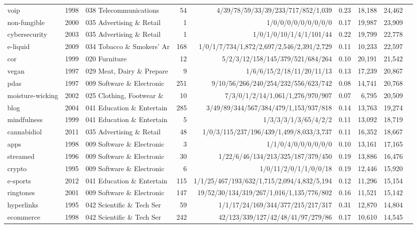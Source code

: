 {\begin{tabular}{llp{3.2cm}rrp{3.4cm}rrr}
voip & 1998 & 038 Telecommunications & 54 & 4/39/78/59/33/39/233/717/852/1,039 & 0.23 & 18,188 & 24,462 \\
non-fungible & 2000 & 035 Advertising \& Retail & 1 & 1/0/0/0/0/0/0/0/0/0 & 0.17 & 19,987 & 23,909 \\
cybersecurity & 2003 & 035 Advertising \& Retail & 1 & 1/0/1/0/10/1/4/1/101/44 & 0.22 & 19,799 & 22,778 \\
e-liquid & 2009 & 034 Tobacco \& Smokers' Ar & 168 & 1/0/1/7/734/1,872/2,697/2,546/2,391/2,729 & 0.11 & 10,233 & 22,597 \\
cor & 1999 & 020 Furniture & 12 & 5/2/3/12/158/145/379/521/684/264 & 0.10 & 20,191 & 21,542 \\
vegan & 1997 & 029 Meat, Dairy \& Prepare & 9 & 1/6/6/15/2/18/11/20/11/13 & 0.13 & 17,239 & 20,867 \\
pdas & 1997 & 009 Software \& Electronic & 251 & 9/10/56/266/240/254/232/556/623/742 & 0.08 & 14,741 & 20,768 \\
moisture-wicking & 2002 & 025 Clothing, Footwear \&  & 10 & 7/3/0/1/2/14/1,061/1,276/970/907 & 0.07 & 6,795 & 20,509 \\
blog & 2004 & 041 Education \& Entertain & 285 & 3/49/89/344/567/384/479/1,153/937/818 & 0.14 & 13,763 & 19,274 \\
mindfulness & 1999 & 041 Education \& Entertain & 5 & 1/3/3/3/1/3/65/4/2/2 & 0.11 & 13,092 & 18,719 \\
cannabidiol & 2011 & 035 Advertising \& Retail & 48 & 1/0/3/115/237/196/439/1,499/8,033/3,737 & 0.11 & 16,352 & 18,667 \\
apps & 1998 & 009 Software \& Electronic & 3 & 1/1/0/4/0/0/0/0/0/0 & 0.10 & 13,161 & 17,165 \\
streamed & 1996 & 009 Software \& Electronic & 30 & 1/22/6/46/134/213/325/187/379/450 & 0.19 & 13,886 & 16,476 \\
crypto & 1995 & 009 Software \& Electronic & 6 & 1/0/11/2/0/1/1/0/0/18 & 0.19 & 12,446 & 15,920 \\
e-sports & 2012 & 041 Education \& Entertain & 115 & 1/1/25/467/193/632/1,715/2,094/4,832/5,194 & 0.12 & 11,296 & 15,154 \\
ringtones & 2001 & 009 Software \& Electronic & 147 & 19/52/30/134/319/267/1,016/1,135/776/802 & 0.16 & 11,521 & 15,142 \\
hyperlinks & 1995 & 042 Scientific \& Tech Ser & 59 & 1/1/17/24/169/344/377/215/217/317 & 0.31 & 12,870 & 14,804 \\
ecommerce & 1998 & 042 Scientific \& Tech Ser & 242 & 42/123/339/127/42/48/41/97/279/86 & 0.17 & 10,610 & 14,545 \\

\end{tabular}}
